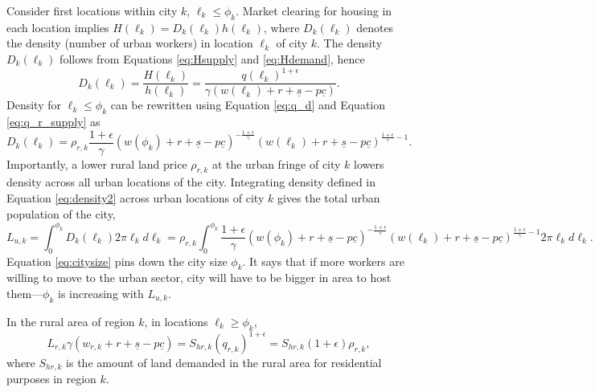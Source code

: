 \documentclass[20250130-paper.tex]{subfiles}
\begin{document}
Consider first locations within city $k$, $\ell_k \leq \phi_k$. Market clearing for housing in each location implies $H(\ell_k)=D_k(\ell_k)h(\ell_k)$, where $D_k(\ell_k)$ denotes the density (number of urban workers) in location $\ell_k$ of city $k$. The density $D_k(\ell_k)$ follows from Equations \eqref{eq:Hsupply} and \eqref{eq:Hdemand}, hence
\begin{equation}
D_k(\ell_k)=\frac{H(\ell_k)}{h(\ell_k)}=\frac{ q(\ell_k)^{1+\epsilon}}{\gamma(w(\ell_k)+r+\underline{s}-p\underline{c})}\label{eq:density}.
\end{equation}
Density for $\ell_k \leq \phi_k$ can be rewritten using Equation \eqref{eq:q_d} and Equation \eqref{eq:q_r_supply} as
\begin{equation}
D_k(\ell_k)=  \rho_{r,k} \frac{1+\epsilon}{\gamma}(w(\phi_k)+r+\underline{s}-p\underline{c}) ^{-\frac{1+\epsilon}{\gamma}} (w(\ell_k)+r+\underline{s}-p\underline{c})^{\frac{1+\epsilon}{\gamma} -1}.\label{eq:density2}
\end{equation}
Importantly, a lower rural land price $\rho_{r,k}$ at the urban fringe of city $k$ lowers density across all urban locations of the city. Integrating density defined in Equation \eqref{eq:density2} across urban locations of city $k$ gives the total urban population of the city,
\begin{equation}
L_{u,k}=\int_0^{\phi_k}D_k(\ell_k)2\pi \ell_k d\ell_k= \rho_{r,k} \int_0^{\phi_k}\frac{1+\epsilon}{\gamma}(w(\phi_k)+r+ \underline{s}-p\underline{c}) ^{-\frac{1+\epsilon}{\gamma} } (w(\ell_k)+r+ \underline{s}-p\underline{c})^{\frac{1+\epsilon}{\gamma} -1}2\pi \ell_k d\ell_k. \label{eq:citysize}
\end{equation}
Equation \eqref{eq:citysize} pins down the city size $\phi_k$. It says that if more workers are willing to move to the urban sector, city will have to be bigger in area to host them---$\phi_k$ is increasing with $L_{u,k}$. %

In the rural area of region $k$, in locations $\ell_k \geq \phi_k$,
\begin{equation*}
L_{r,k} \gamma \left( w_{r,k}+r+\underline{s}-p\underline{c}\right)=S_{hr,k} \left(q_{r,k}\right)^{1+\epsilon}=S_{hr,k}(1+\epsilon)\rho_{r,k},
\end{equation*}
where $S_{hr,k}$ is the amount of land demanded in the rural area for residential purposes in region $k$.
\end{document}
